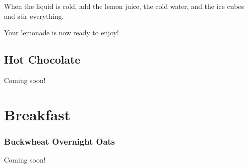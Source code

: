 When the liquid is cold, add the lemon juice, the cold water, and the ice cubes and stir everything. 
	
	
Your lemonade is now ready to enjoy!
	
\subsection{Hot Chocolate}
Coming soon!
	
\section{Breakfast}

\subsubsection{Buckwheat Overnight Oats}
Coming soon!
	
% 
